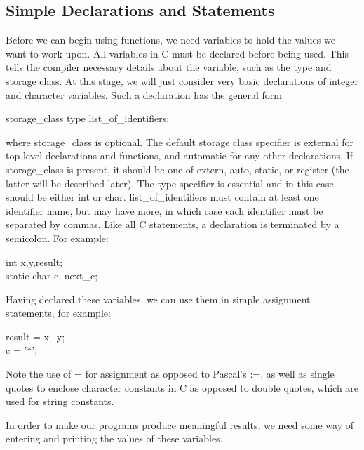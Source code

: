 \begin{description}
\end{description}   

\subsection{Simple Declarations and Statements}

     Before we can begin using functions, we need variables to hold
the values we want  to work  upon. All  variables in  C must  be
declared before being used.  This tells the compiler necessary 
details about  the variable,  such as the type and storage 
class. At 
this stage,  we will  just consider  very  basic  declarations of
integer and character variables. Such a declaration has the general
form
 \begin{display}
{\ms storage\_class\/} {\ms type\/} {\ms list\_of\_identifiers\/};
\end{display}
\noindent
 where {\ms storage\_class\/} is optional.  The default storage class
specifier is external for top  level  declarations  and  functions, 
and automatic  for  any  other declarations.  If {\ms
storage\_class\/} is present, it should be one of {\cd extern}, {\cd
auto}, {\cd static}, or {\cd register} (the latter will be described
later).  The {\ms type\/} specifier is essential  and
in this case should be either {\cd int} or {\cd char}.  {\ms
list\_of\_identifiers\/} must  contain at  least one identifier name,
but may have more, in which case each identifier must  be separated 
by  commas.  Like all  C  statements, a declaration is terminated by
a semicolon. For example:
 \begin{code}
int x,y,result; \\
static char c, next\_c; 
\end{code}
\noindent
Having declared  these variables,  we can  use them  in simple 
{\kc assignment statements\/}, for example:
\begin{code}
 result = x+y; \\
 c = '*';
\end{code}
\noindent
Note the  use of  {\cd =} for assignment as opposed to Pascal's {\cd
:=}, as well as single quotes  to enclose  {\kc character
constants\/} in C as opposed to double quotes, which are used for {\kc
string constants\/}.

     In order  to make  our programs  produce meaningful results, we
need some way of entering and printing the values of these variables.

